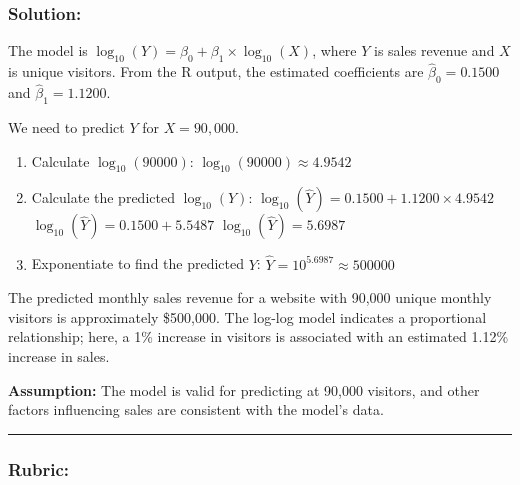 \documentclass[
  letterpaper,
  DIV=11,
  numbers=noendperiod]{scrartcl}
\begin{document}
\subsubsection{Solution:}\label{solution-3}

The model is \(\log_{10}(Y) = \beta_0 + \beta_1 \times \log_{10}(X)\),
where \(Y\) is sales revenue and \(X\) is unique visitors. From the R
output, the estimated coefficients are \(\hat{\beta}_0 = 0.1500\) and
\(\hat{\beta}_1 = 1.1200\).

We need to predict \(Y\) for \(X = 90,000\).

\begin{enumerate}
\def\labelenumi{\arabic{enumi}.}
\item
  Calculate \(\log_{10}(90000)\): \(\log_{10}(90000) \approx 4.9542\)
\item
  Calculate the predicted \(\log_{10}(Y)\):
  \(\log_{10}(\hat{Y}) = 0.1500 + 1.1200 \times 4.9542\)
  \(\log_{10}(\hat{Y}) = 0.1500 + 5.5487\)
  \(\log_{10}(\hat{Y}) = 5.6987\)
\item
  Exponentiate to find the predicted \(Y\):
  \(\hat{Y} = 10^{5.6987} \approx 500000\)
\end{enumerate}

The predicted monthly sales revenue for a website with 90,000 unique
monthly visitors is approximately \$500,000. The log-log model indicates
a proportional relationship; here, a 1\% increase in visitors is
associated with an estimated 1.12\% increase in sales.

\textbf{Assumption:} The model is valid for predicting at 90,000
visitors, and other factors influencing sales are consistent with the
model's data.

\begin{center}\rule{0.5\linewidth}{0.5pt}\end{center}

\subsubsection{Rubric:}\label{rubric-3}
\end{document}
